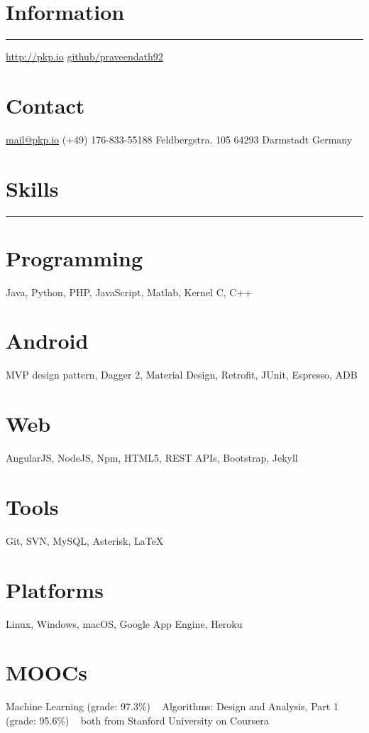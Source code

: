 \documentclass[]{friggeri-cv}
\begin{document}

\begin{aside}
  \section{Information}
    \noindent\rule{3cm}{0.5pt}
    \href{http://pkp.io}{http://pkp.io}
    \href{https://github.com/praveendath92}{github/praveendath92}    
  \section{Contact}
    \href{mailto:mail@pkp.io}{mail@pkp.io}
    (+49) 176-833-55188
    Feldbergstra. 105
    64293 Darmstadt
    Germany
    ~
  \section{Skills}
    \noindent\rule{3cm}{0.5pt}
  \section{Programming}
    Java, Python, PHP, JavaScript, Matlab, Kernel C, C++
  \section{Android}
    MVP design pattern, Dagger 2, Material Design, Retrofit, JUnit, Espresso, ADB
  \section{Web}
    AngularJS, NodeJS, Npm, HTML5, REST APIs, Bootstrap, Jekyll
  \section{Tools}
    Git, SVN, MySQL, Asterisk, \LaTeX
  \section{Platforms}
    Linux, Windows, macOS, Google App Engine, Heroku
  \section{MOOCs}
    Machine Learning (grade: 97.3\%)
    ~
    Algorithms: Design and Analysis, Part 1 (grade: 95.6\%)
	~
    both from Stanford University on Coursera
\end{aside}
~
\end{document}
